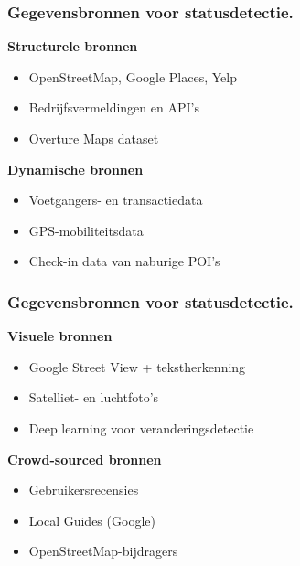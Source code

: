 \documentclass[aspectratio=169]{beamer}
\begin{document}
    \begin{frame}
    \frametitle{Gegevensbronnen voor statusdetectie.}
    
    \begin{flushleft}
        \textbf{Structurele bronnen}
        \begin{itemize}
            \item OpenStreetMap, Google Places, Yelp
            \item Bedrijfsvermeldingen en API's
            \item Overture Maps dataset
        \end{itemize}
        \vspace{0.4em}
        \textbf{Dynamische bronnen}
        \begin{itemize}
            \item Voetgangers- en transactiedata
            \item GPS-mobiliteitsdata
            \item Check-in data van naburige POI's
        \end{itemize}
    \end{flushleft}
    
    \end{frame}
    
    \begin{frame}
        \frametitle{Gegevensbronnen voor statusdetectie.}
            
            \begin{flushleft}
                \textbf{Visuele bronnen}
                \begin{itemize}
                    \item Google Street View + tekstherkenning
                    \item Satelliet- en luchtfoto's
                    \item Deep learning voor veranderingsdetectie
                \end{itemize}
                \vspace{0.4em}
                \textbf{Crowd-sourced bronnen}
                \begin{itemize}
                    \item Gebruikersrecensies
                    \item Local Guides (Google)
                    \item OpenStreetMap-bijdragers
                \end{itemize}
            \end{flushleft}
        
    \end{frame}
    
\end{document}
